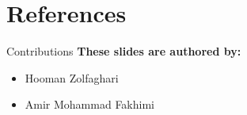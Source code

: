 \documentclass[serif, aspectratio=169]{beamer}
\begin{document}
\section{References}

\begin{frame}{Contributions}
\textbf{These slides are authored by:}
    \begin{itemize}
        \item Hooman Zolfaghari
        \item Amir Mohammad Fakhimi
    \end{itemize}
    
\end{frame}


\begin{frame}[allowframebreaks]
   \nocite{*} %
\end{frame}
\end{document}
